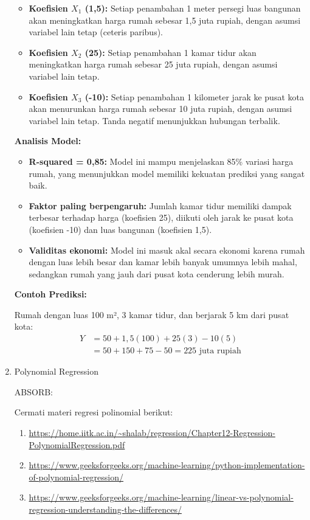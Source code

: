 \documentclass[a4paper]{article}
\begin{document}
\begin{enumerate}[itemsep=1em,leftmargin=*]
\begin{itemize}
    \item \textbf{Koefisien $X_1$ (1,5):} Setiap penambahan 1 meter persegi luas bangunan akan meningkatkan harga rumah sebesar 1,5 juta rupiah, dengan asumsi variabel lain tetap (ceteris paribus).
    
    \item \textbf{Koefisien $X_2$ (25):} Setiap penambahan 1 kamar tidur akan meningkatkan harga rumah sebesar 25 juta rupiah, dengan asumsi variabel lain tetap.
    
    \item \textbf{Koefisien $X_3$ (-10):} Setiap penambahan 1 kilometer jarak ke pusat kota akan menurunkan harga rumah sebesar 10 juta rupiah, dengan asumsi variabel lain tetap. Tanda negatif menunjukkan hubungan terbalik.
  \end{itemize}
  
  \textbf{Analisis Model:}
  \begin{itemize}
    \item \textbf{R-squared = 0,85:} Model ini mampu menjelaskan 85\% variasi harga rumah, yang menunjukkan model memiliki kekuatan prediksi yang sangat baik.
    
    \item \textbf{Faktor paling berpengaruh:} Jumlah kamar tidur memiliki dampak terbesar terhadap harga (koefisien 25), diikuti oleh jarak ke pusat kota (koefisien -10) dan luas bangunan (koefisien 1,5).
    
    \item \textbf{Validitas ekonomi:} Model ini masuk akal secara ekonomi karena rumah dengan luas lebih besar dan kamar lebih banyak umumnya lebih mahal, sedangkan rumah yang jauh dari pusat kota cenderung lebih murah.
  \end{itemize}
  
  \textbf{Contoh Prediksi:}
  
  Rumah dengan luas 100 m², 3 kamar tidur, dan berjarak 5 km dari pusat kota:
  \begin{align}
  Y &= 50 + 1,5(100) + 25(3) - 10(5) \\
  &= 50 + 150 + 75 - 50 = 225 \text{ juta rupiah}
  \end{align}

  \item Polynomial Regression
  
  ABSORB:

  Cermati materi regresi polinomial berikut:
  \begin{enumerate}
    \item \url{https://home.iitk.ac.in/~shalab/regression/Chapter12-Regression-PolynomialRegression.pdf}
    \item \url{https://www.geeksforgeeks.org/machine-learning/python-implementation-of-polynomial-regression/}
    \item \url{https://www.geeksforgeeks.org/machine-learning/linear-vs-polynomial-regression-understanding-the-differences/}
  \end{enumerate}


\end{enumerate}
\end{document}
